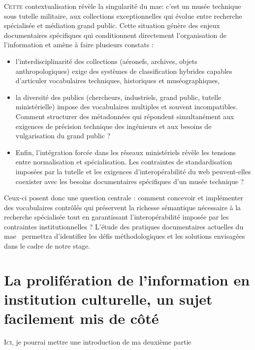 \documentclass[12pt,twoside]{book}
\newcommand{\mae}{\ac{mae}}
\newcommand{\maelong}{\acf{mae}}
\begin{document}
	\lettrine{C}{ette} contextualisation révèle la singularité du \maelong : c'est un musée technique sous tutelle militaire, aux collections exceptionnelles qui évolue entre recherche spécialisée et médiation grand public. Cette situation génère des enjeux documentaires spécifiques qui conditionnent directement l'organisation de l'information et amène à faire plusieurs constats : 
	\begin{itemize}
		\item l'interdisciplinarité des collections (aéronefs, archives, objets anthropologiques) exige des systèmes de classification hybrides capables d'articuler vocabulaires techniques, historiques et muséographiques,
		\item la diversité des publics (chercheurs, industriels, grand public, tutelle ministérielle) impose des vocabulaires multiples et souvent incompatibles. Comment structurer des métadonnées qui répondent simultanément aux exigences de précision technique des ingénieurs et aux besoins de vulgarisation du grand public ?
		\item Enfin, l'intégration forcée dans les réseaux ministériels révèle les tensions entre normalisation et spécialisation. Les contraintes de standardisation imposées par la tutelle et les exigences d'interopérabilité du web peuvent-elles coexister avec les besoins documentaires spécifiques d'un musée technique ?
	\end{itemize}
	
	Ceux-ci posent donc une question centrale : comment concevoir et implémenter des vocabulaires contrôlés qui préservent la richesse sémantique nécessaire à la recherche spécialisée tout en garantissant l'interopérabilité imposée par les contraintes institutionnelles ? L'étude des pratiques documentaires actuelles du \mae~ permettra d'identifier les défis méthodologiques et les solutions envisagées dans le cadre de notre stage.
	
	
	\part{La prolifération de l'information en institution culturelle, un sujet facilement mis de côté}
	
	
	\lettrine{I}{ci}, je pourrai mettre une introduction de ma deuxième partie
	
\end{document}

